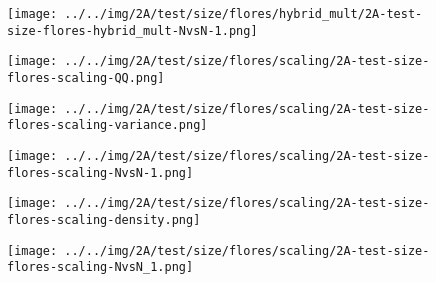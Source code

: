 \begin{figure}[H]
\centering	\texttt{[image: ../../img/2A/test/size/flores/hybrid\_mult/2A-test-size-flores-hybrid\_mult-NvsN-1.png]}
\end{figure}
\begin{figure}[H]
\centering	\texttt{[image: ../../img/2A/test/size/flores/scaling/2A-test-size-flores-scaling-QQ.png]}
\end{figure}
\begin{figure}[H]
\centering	\texttt{[image: ../../img/2A/test/size/flores/scaling/2A-test-size-flores-scaling-variance.png]}
\end{figure}
\begin{figure}[H]
\centering	\texttt{[image: ../../img/2A/test/size/flores/scaling/2A-test-size-flores-scaling-NvsN-1.png]}
\end{figure}
\begin{figure}[H]
\centering	\texttt{[image: ../../img/2A/test/size/flores/scaling/2A-test-size-flores-scaling-density.png]}
\end{figure}
\begin{figure}[H]
\centering	\texttt{[image: ../../img/2A/test/size/flores/scaling/2A-test-size-flores-scaling-NvsN\_1.png]}
\end{figure}
